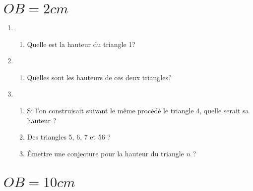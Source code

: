 \section{$OB = 2cm$}
\begin{enumerate}\setlength{\itemsep}{15pt}%
    \item \begin{enumerate}

        \item Quelle est la hauteur du triangle 1?
    \end{enumerate}
    \item \begin{enumerate}
        \item Quelles sont les hauteurs de ces deux triangles?
        
    \end{enumerate}
    \item \begin{enumerate}
        \item Si l'on construisait suivant le même procédé le triangle 4,
        quelle serait sa hauteur ? 
        \item Des triangles 5, 6, 7 et 56 ?
        \item Émettre une conjecture pour la hauteur du triangle $n$ ?
    \end{enumerate}
\end{enumerate}

\section{$OB = 10cm$}

